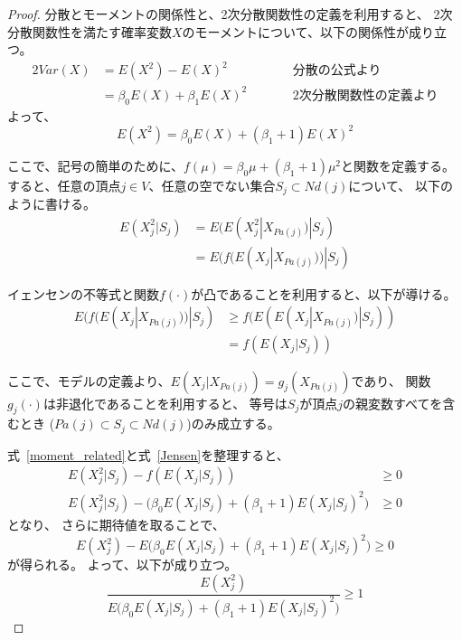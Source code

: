 \begin{proof}
  分散とモーメントの関係性と、2次分散関数性の定義を利用すると、
  2次分散関数性を満たす確率変数$X$のモーメントについて、以下の関係性が成り立つ。
  \begin{alignat*}{2}
    \mathit{Var}(X) &= E(X^2) - E(X)^2 & \qquad & \text{分散の公式より} \\
                    &= \beta_0 E(X) + \beta_1 E(X)^2 && \text{2次分散関数性の定義より}
  \end{alignat*}
  よって、
  \begin{equation*}
    E(X^2) = \beta_0 E(X) + (\beta_1 + 1) E(X)^2
  \end{equation*}

  ここで、記号の簡単のために、$f(\mu) = \beta_0 \mu + (\beta_1 + 1)\mu^2$と関数を定義する。
  すると、任意の頂点$j \in V$、任意の空でない集合$S_j \subset \mathit{Nd}(j)$について、
  以下のように書ける。
  \begin{equation}
    \begin{split}
      E(X_j^2 | S_j) &= E(E(X_j^2 | X_{Pa(j)}) | S_j) \\
                     &= E(f(E(X_j | X_{Pa(j)})) | S_j)
      \label{moment_related}
    \end{split}
  \end{equation}

  イェンセンの不等式と関数$f(\cdot)$が凸であることを利用すると、以下が導ける。
  \begin{equation}
    \begin{split}
      E(f(E(X_j | X_{Pa(j)})) | S_j) & \geq
      f(E(E(X_j | X_{Pa(j)}) | S_j)) \\
      &= f(E(X_j | S_j))
      \label{Jensen}
    \end{split}
  \end{equation}

  ここで、モデルの定義より、$E(X_j | X_{Pa(j)}) = g_j(X_{Pa(j)})$であり、
  関数$g_j(\cdot)$は非退化であることを利用すると、
  等号は$S_j$が頂点$j$の親変数すべてを含むとき
  ($Pa(j) \subset S_j \subset \mathit{Nd}(j)$)のみ成立する。

  式~\eqref{moment_related}と式~\eqref{Jensen}を整理すると、
  \begin{equation*}
    \begin{split}
      E(X_j^2 | S_j) - f(E(X_j | S_j)) & \geq 0 \\
      E(X_j^2 | S_j) - \bigl( \beta_0 E(X_j | S_j) +
      (\beta_1 + 1) E(X_j | S_j)^2 \bigl) & \geq 0
    \end{split}
  \end{equation*}
  となり、
  さらに期待値を取ることで、
  \begin{equation*}
    E(X_j^2) - E\bigl(\beta_0 E(X_j | S_j) + (\beta_1 + 1) E(X_j | S_j)^2 \bigl) \geq 0
  \end{equation*}
  が得られる。 よって、以下が成り立つ。
  \begin{equation*}
    \frac{E(X_j^2)}
    {E\bigl( \beta_0 E(X_j | S_j) + (\beta_1 + 1) E(X_j | S_j)^2 \bigl)}
    \geq 1
  \end{equation*}


\end{proof}
